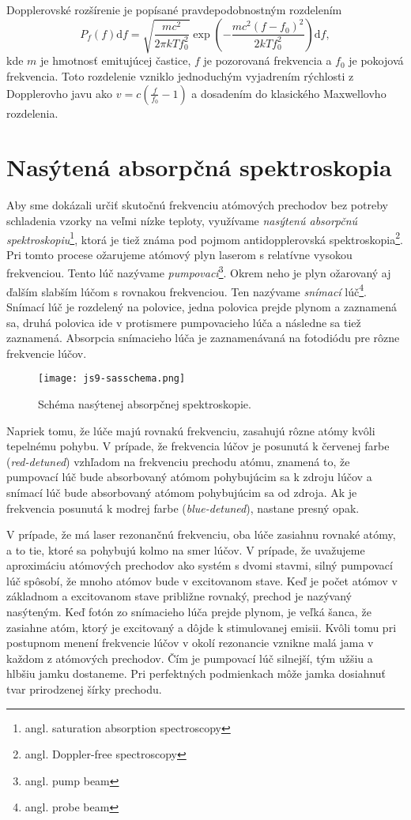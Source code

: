 \documentclass[../../main.tex]{subfiles}
\begin{document}
Dopplerovské rozšírenie je popísané pravdepodobnostným rozdelením
\begin{equation}
P_f(f)\mathrm{d}f=\sqrt{\dfrac{mc^2}{2\pi kTf_0^2}} \exp\left(-\dfrac{mc^2(f-f_0)^2}{2kTf_0^2}\right)\mathrm{d}f,
\end{equation}
kde $m$ je hmotnosť emitujúcej častice, $f$ je pozorovaná frekvencia a $f_0$ je pokojová frekvencia. Toto rozdelenie vzniklo jednoduchým vyjadrením rýchlosti z Dopplerovho javu ako $v=c(\frac{f}{f_0}-1)$ a dosadením do klasického Maxwellovho rozdelenia.

\section{Nasýtená absorpčná spektroskopia}

Aby sme dokázali určiť skutočnú frekvenciu atómových prechodov bez potreby schladenia vzorky na veľmi nízke teploty, využívame \textit{nasýtenú absorpčnú spektroskopiu}\footnote{angl. saturation absorption spectroscopy}, ktorá je tiež známa pod pojmom antidopplerovská spektroskopia\footnote{angl. Doppler-free spectroscopy}. Pri tomto procese ožarujeme atómový plyn laserom s relatívne vysokou frekvenciou. Tento lúč nazývame \textit{pumpovací}\footnote{angl. pump beam}. Okrem neho je plyn ožarovaný aj ďalším slabším lúčom s rovnakou frekvenciou. Ten nazývame \textit{snímací} lúč\footnote{angl. probe beam}. Snímací lúč je rozdelený na polovice, jedna polovica prejde plynom a zaznamená sa, druhá polovica ide v protismere pumpovacieho lúča a následne sa tiež zaznamená. Absorpcia snímacieho lúča je zaznamenávaná na fotodiódu pre rôzne frekvencie lúčov.

\begin{figure}[h]
\centering
\texttt{[image: js9-sasschema.png]}
\caption{Schéma nasýtenej absorpčnej spektroskopie.}
\label{js9:img:sasschema}
\end{figure}

Napriek tomu, že lúče majú rovnakú frekvenciu, zasahujú rôzne atómy kvôli tepelnému pohybu. V prípade, že frekvencia lúčov je posunutá k červenej farbe (\textit{red-detuned}) vzhľadom na frekvenciu prechodu atómu, znamená to, že pumpovací lúč bude absorbovaný atómom pohybujúcim sa k zdroju lúčov a snímací lúč bude absorbovaný atómom pohybujúcim sa od zdroja. Ak je frekvencia posunutá k modrej farbe (\textit{blue-detuned}), nastane presný opak.

V prípade, že má laser rezonančnú frekvenciu, oba lúče zasiahnu rovnaké atómy, a to tie, ktoré sa pohybujú kolmo na smer lúčov. V prípade, že uvažujeme aproximáciu atómových prechodov ako systém s dvomi stavmi, silný pumpovací lúč spôsobí, že mnoho atómov bude v excitovanom stave. Keď je počet atómov v základnom a excitovanom stave približne rovnaký, prechod je nazývaný nasýteným. Keď fotón zo snímacieho lúča prejde plynom, je veľká šanca, že zasiahne atóm, ktorý je excitovaný a dôjde k stimulovanej emisii. Kvôli tomu pri postupnom menení frekvencie lúčov v okolí rezonancie vznikne malá jama v každom z atómových prechodov. Čím je pumpovací lúč silnejší, tým užšiu a hlbšiu jamku dostaneme. Pri perfektných podmienkach môže jamka dosiahnuť tvar prirodzenej šírky prechodu.
\vspace{1cm}
\end{document}
